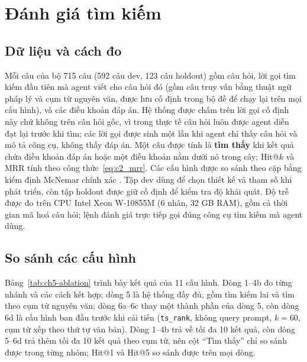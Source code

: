 \section{Đánh giá tìm kiếm}
\label{sec:ch5-tim-kiem}

\subsection{Dữ liệu và cách đo}

Mỗi câu của bộ 715 câu (592 câu dev, 123 câu holdout) gồm câu hỏi, lời gọi tìm kiếm đầu tiên mà agent viết cho câu hỏi đó (gồm câu truy vấn bằng thuật ngữ pháp lý và cụm từ nguyên văn, được lưu cố định trong bộ đề để chạy lại trên mọi cấu hình), và các điều khoản đáp án. Hệ thống được chấm trên lời gọi cố định này chứ không trên câu hỏi gốc, vì trong thực tế câu hỏi luôn được agent diễn đạt lại trước khi tìm; các lời gọi được sinh một lần khi agent chỉ thấy câu hỏi và mô tả công cụ, không thấy đáp án. Một câu được tính là \textbf{tìm thấy} khi kết quả chứa điều khoản đáp án hoặc một điều khoản nằm dưới nó trong cây; Hit@$k$ và MRR tính theo công thức~\eqref{eq:c2_mrr}. Các cấu hình được so sánh theo cặp bằng kiểm định McNemar chính xác \cite{mcnemar1947}. Tập dev dùng để chọn thiết kế và tham số khi phát triển, còn tập holdout được giữ cố định để kiểm tra độ khái quát. Độ trễ được đo trên CPU Intel Xeon W-10855M (6 nhân, 32 GB RAM), gồm cả thời gian mã hoá câu hỏi; lệnh đánh giá trực tiếp gọi đúng công cụ tìm kiếm mà agent dùng.

\subsection{So sánh các cấu hình}

Bảng~\ref{tab:ch5-ablation} trình bày kết quả của 11 cấu hình. Dòng 1--4b đo từng nhánh và các cách kết hợp; dòng 5 là hệ thống đầy đủ, gồm tìm kiếm lai và tìm theo cụm từ nguyên văn; dòng 6a--6c thay một thành phần của dòng 5, còn dòng 6d là cấu hình ban đầu trước khi cải tiến (\texttt{ts\_rank}, không query prompt, $k = 60$, cụm từ xếp theo thứ tự văn bản). Dòng 1--4b trả về tối đa 10 kết quả, còn dòng 5--6d trả thêm tối đa 10 kết quả theo cụm từ, nên cột ``Tìm thấy'' chỉ so sánh được trong từng nhóm; Hit@1 và Hit@5 so sánh được trên mọi dòng.

